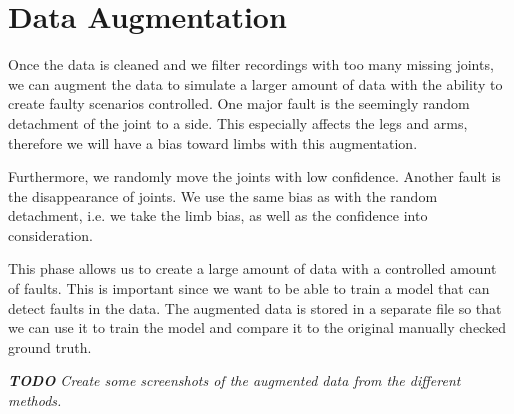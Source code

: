 \section{Data Augmentation}

Once the data is cleaned and we filter recordings with too many missing joints, we can augment the data to simulate a larger amount of data with the ability to create faulty scenarios controlled. One major fault is the seemingly random detachment of the joint to a side. This especially affects the legs and arms, therefore we will have a bias toward limbs with this augmentation. 

Furthermore, we randomly move the joints with low confidence. Another fault is the disappearance of joints. We use the same bias as with the random detachment, i.e. we take the limb bias, as well as the confidence into consideration.

This phase allows us to create a large amount of data with a controlled amount of faults. This is important since we want to be able to train a model that can detect faults in the data. The augmented data is stored in a separate file so that we can use it to train the model and compare it to the original manually checked ground truth.

\textit{\textbf{TODO} Create some screenshots of the augmented data from the different methods.}